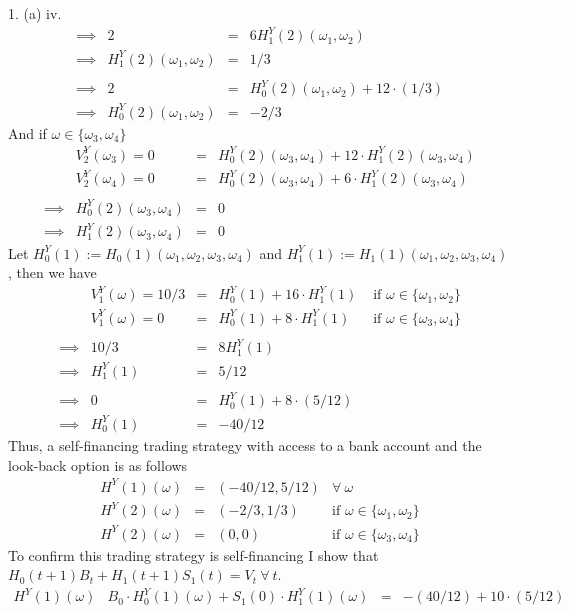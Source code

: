 \documentclass[11pt,a4paper]{article}
\begin{document}
\begin{answer}{1. (a) iv.}
\[\begin{array}{rrcl}
    \implies&2&=&6H_1^Y(2)(\omega_1,\omega_2)\\
    \implies&H_1^Y(2)(\omega_1,\omega_2)&=&1/3\\\\
    \implies&2&=&H_0^Y(2)(\omega_1,\omega_2)+12\cdot(1/3)\\
    \implies&H_0^Y(2)(\omega_1,\omega_2)&=&-2/3
  \end{array}\]
  And if $\omega\in\{\omega_3,\omega_4\}$
  \[\begin{array}{rrcl}
    &V_2^Y(\omega_3)=0&=&H_0^Y(2)(\omega_3,\omega_4)+12\cdot H_1^Y(2)(\omega_3,\omega_4)\\
    &V_2^Y(\omega_4)=0&=&H_0^Y(2)(\omega_3,\omega_4)+6\cdot H_1^Y(2)(\omega_3,\omega_4)\\\\
    \implies&H_0^Y(2)(\omega_3,\omega_4)&=&0\\
    \implies&H_1^Y(2)(\omega_3,\omega_4)&=&0
  \end{array}\]
  Let $H_0^Y(1):=H_0(1)(\omega_1,\omega_2,\omega_3,\omega_4)$ and $H_1^Y(1):=H_1(1)(\omega_1,\omega_2,\omega_3,\omega_4)$, then we have
  \[\begin{array}{rrcll}
    &V_1^Y(\omega)=10/3&=&H_0^Y(1)+16\cdot H_1^Y(1)&\text{ if }\omega\in\{\omega_1,\omega_2\}\\
    &V_1^Y(\omega)=0&=&H_0^Y(1)+8\cdot H_1^Y(1)&\text{ if }\omega\in\{\omega_3,\omega_4\}\\\\
    \implies&10/3&=&8H_1^Y(1)\\
    \implies&H_1^Y(1)&=&5/12\\\\
    \implies&0&=&H_0^Y(1)+8\cdot(5/12)\\
    \implies&H_0^Y(1)&=&-40/12
  \end{array}\]
  Thus, a self-financing trading strategy with access to a bank account and the look-back option is as follows
  \[\begin{array}{rcll}
    H^Y(1)(\omega)&=&(-40/12,5/12)&\forall\ \omega\\
    H^Y(2)(\omega)&=&(-2/3,1/3)&\text{if }\omega\in\{\omega_1,\omega_2\}\\
    H^Y(2)(\omega)&=&(0,0)&\text{if }\omega\in\{\omega_3,\omega_4\}
  \end{array}\]
  To confirm this trading strategy is self-financing I show that $H_0(t+1)B_t+H_1(t+1)S_1(t)=V_t\ \forall\ t$.
  \[\begin{array}{r|rclcll}
    H^Y(1)(\omega)&B_0\cdot H_0^Y(1)(\omega)+S_1(0)\cdot H_1^Y(1)(\omega)&=&-(40/12)+10\cdot(5/12)\\

\end{array}\]
\end{answer}
\end{document}
